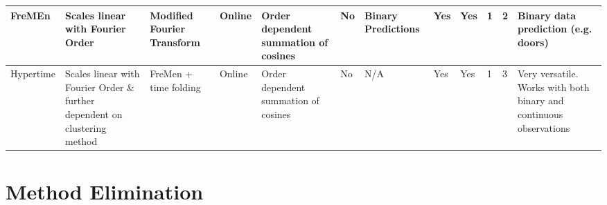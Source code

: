 \begin{center}
{{\begin{tabular}{|p{2.3cm}|p{4cm}|p{3cm}|p{2cm}|p{3cm}|p{1.5cm}|p{3cm}|p{2cm}|p{2cm}|p{2cm}|p{3cm}|p{3cm}|}
        FreMEn    & Scales linear with Fourier Order                                           & Modified Fourier Transform  & Online            & Order dependent summation of cosines           & No            & Binary Predictions     & Yes                    & Yes                   & 1                 & 2                         & Binary data prediction (e.g. doors)                                \\ \hline
        Hypertime & Scales linear with Fourier Order \& further dependent on clustering method & FreMen + time folding       & Online            & Order dependent summation of cosines           & No            & N/A                    & Yes                    & Yes                   & 1                 & 3                         & Very versatile. Works with both binary and continuous observations \\ \hline
        \end{tabular}%
      }
  }
  \end{center}

  \section{ Method Elimination }

